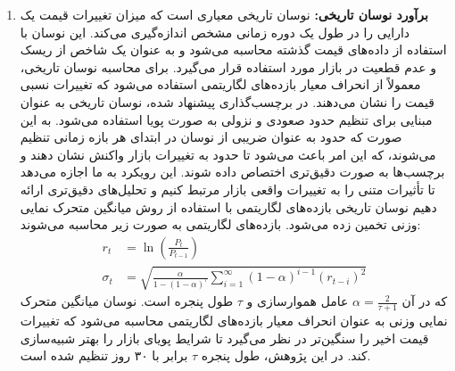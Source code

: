 \begin{enumerate}
    \item \textbf{برآورد نوسان تاریخی:}
    نوسان تاریخی معیاری است که میزان تغییرات قیمت یک دارایی را در طول یک دوره زمانی مشخص اندازه‌گیری می‌کند. این نوسان با استفاده از داده‌های قیمت گذشته محاسبه می‌شود و به عنوان یک شاخص از ریسک و عدم قطعیت در بازار مورد استفاده قرار می‌گیرد. برای محاسبه نوسان تاریخی، معمولاً از انحراف معیار بازده‌های لگاریتمی استفاده می‌شود که تغییرات نسبی قیمت را نشان می‌دهند. در برچسب‌گذاری پیشنهاد شده، نوسان تاریخی به عنوان مبنایی برای تنظیم حدود صعودی و نزولی به صورت پویا استفاده می‌شود. به این صورت که حدود به عنوان ضریبی از نوسان در ابتدای هر بازه زمانی تنظیم می‌شوند، که این امر باعث می‌شود تا حدود به تغییرات بازار واکنش نشان دهند و برچسب‌ها به صورت دقیق‌تری اختصاص داده شوند. این رویکرد به ما اجازه می‌دهد تا تأثیرات متنی را به تغییرات واقعی بازار مرتبط کنیم و تحلیل‌های دقیق‌تری ارائه دهیم 
    نوسان تاریخی بازده‌های لگاریتمی با استفاده از روش میانگین متحرک نمایی وزنی تخمین زده می‌شود. بازده‌های لگاریتمی به صورت زیر محاسبه می‌شوند:
    \begin{align}
    r_t &= \ln\left(\frac{P_t}{P_{t-1}}\right) \\
    \sigma_t &= \sqrt{\frac{\alpha}{1 - (1 - \alpha)^\tau} \sum_{i=1}^\infty (1-\alpha)^{i-1} (r_{t-i})^2}
    \end{align}
    که در آن \(\alpha = \frac{2}{\tau + 1}\) عامل هموارسازی و \(\tau\) طول پنجره است. نوسان میانگین متحرک نمایی وزنی به عنوان انحراف معیار بازده‌های لگاریتمی محاسبه می‌شود که تغییرات قیمت اخیر را سنگین‌تر در نظر می‌گیرد تا شرایط پویای بازار را بهتر شبیه‌سازی کند. در این پژوهش، طول پنجره \(\tau\) برابر با ۳۰ روز تنظیم شده است.


\end{enumerate}
